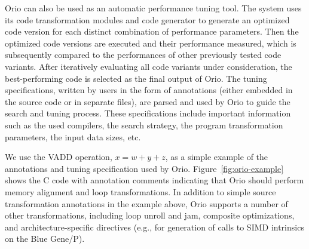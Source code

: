 \documentclass[runningheads]{llncs}
\begin{document}
Orio can also be used as an automatic performance tuning tool. The system uses its code transformation modules and code generator to generate an optimized code version for each distinct combination of performance parameters. Then the optimized code versions are executed and their performance measured, which is subsequently compared to the performances of other previously tested code variants. After iteratively evaluating all code variants under consideration, the best-performing code is selected as the final output of Orio. The tuning specifications, written by users in the form of annotations (either embedded in the source code or in separate files), are parsed and used by Orio to guide the search and tuning process. These specifications include important information such as the used compilers, the search strategy, the program transformation parameters, the input data sizes, etc.

We use the VADD operation, $x = w + y + z$, as a simple example of the annotations and tuning specification used by Orio. Figure~\ref{fig:orio-example} shows the C code with annotation comments indicating that Orio should perform memory alignment and loop transformations. In addition to simple source transformation annotations in the example above, Orio supports a number of other transformations, including loop unroll and jam, composite optimizations, and architecture-specific directives (e.g., for generation of calls to SIMD intrinsics on the Blue Gene/P).
\end{document}
